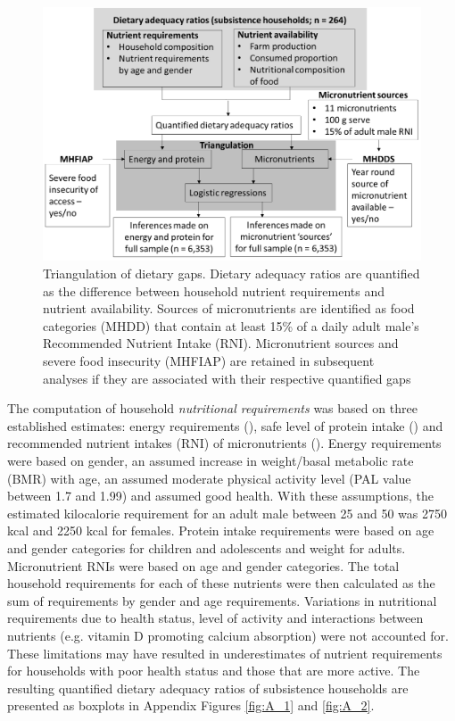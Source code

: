 \begin{figure}[ht]
  \includegraphics[width=1\textwidth]{figs_06/image1.png}
  \caption{Triangulation of dietary gaps. Dietary adequacy ratios are quantified as the difference between household nutrient requirements and nutrient availability. Sources of micronutrients are identified as food categories (MHDD) that contain at least 15\% of a daily adult male's Recommended Nutrient Intake (RNI). Micronutrient sources and severe food insecurity (MHFIAP) are retained in subsequent analyses if they are associated with their respective quantified gaps}
  \label{fig:06_1}
\end{figure}

The computation of household \textit{nutritional requirements} was based on three established estimates: energy requirements (\citealp{FoodandAgricuturalOrganization2001}), safe level of protein intake (\citealp{WHO2002}) and recommended nutrient intakes (RNI) of micronutrients (\citealp{FAO2004}). Energy requirements were based on gender, an assumed increase in weight/basal metabolic rate (BMR) with age, an assumed moderate physical activity level (PAL value between 1.7 and 1.99) and assumed good health. With these assumptions, the estimated kilocalorie requirement for an adult male between 25 and 50 was 2750 kcal and 2250 kcal for females. Protein intake requirements were based on age and gender categories for children and adolescents and weight for adults. Micronutrient RNIs were based on age and gender categories. The total household requirements for each of these nutrients were then calculated as the sum of requirements by gender and age requirements. Variations in nutritional requirements due to health status, level of activity and interactions between nutrients (e.g. vitamin D promoting calcium absorption) were not accounted for. These limitations may have resulted in underestimates of nutrient requirements for households with poor health status and those that are more active. The resulting quantified dietary adequacy ratios of subsistence households are presented as boxplots in Appendix Figures \ref{fig:A_1} and \ref{fig:A_2}.

